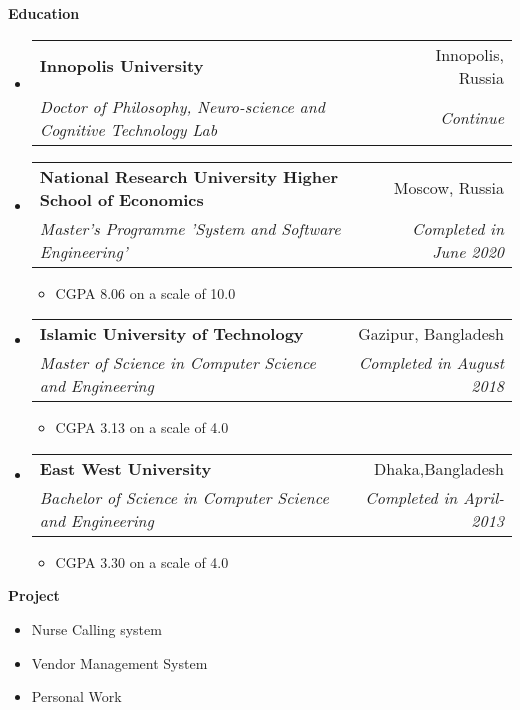 \documentclass[letterpaper,10pt]{article}
\makeatletter
\newcommand{\resitem}[1]{\item #1 \vspace{-2pt}}
\newcommand{\resheading}[1]{{\large \colorbox{mygrey}{\begin{minipage}{\textwidth}{\textbf{#1 \vphantom{p\^{E}}}}\end{minipage}}}}
\newcommand{\ressubheading}[4]{
\begin{tabular*}{6.5in}{l@{\extracolsep{\fill}}r}
		\textbf{#1} & #2 \\
		\textit{#3} & \textit{#4} \\
\end{tabular*}\vspace{-6pt}}
\makeatother
\begin{document}
\resheading{Education}
\begin{itemize}


\item
	\ressubheading{Innopolis University}{Innopolis, Russia}{Doctor of Philosophy, Neuro-science and Cognitive Technology Lab}{Continue}

\item
	\ressubheading{National Research University Higher School of Economics}{Moscow, Russia}{Master’s Programme 'System and Software Engineering'}{Completed in June 2020}
	\begin{itemize}

		\item  CGPA 8.06 on a scale of 10.0

	\end{itemize}


\item
	\ressubheading{Islamic University of Technology}{Gazipur, Bangladesh}{Master of Science in Computer Science and Engineering }{Completed in August 2018}
\begin{itemize}

		\item  CGPA 3.13  on a scale of 4.0

	\end{itemize}
	
\item
	\ressubheading{East West University}{Dhaka,Bangladesh}{Bachelor of Science in Computer Science and Engineering}{Completed in April-2013}
	\begin{itemize}
		\item  CGPA 3.30 on a scale of 4.0

	\end{itemize}


\end{itemize}

\resheading{Project}

\begin{itemize}
\resitem{Nurse Calling system}
\resitem{Vendor Management System}
\resitem{Personal Work}
\end{itemize}
\end{document}
